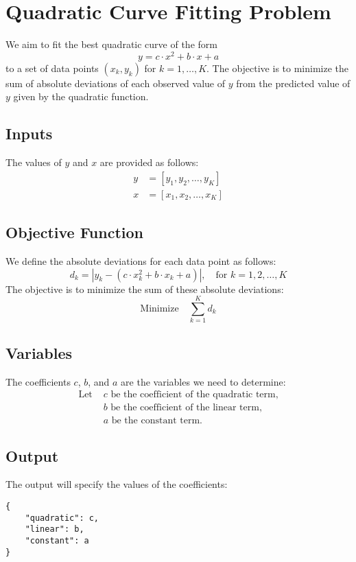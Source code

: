 \documentclass{article}
\begin{document}
\section*{Quadratic Curve Fitting Problem}

We aim to fit the best quadratic curve of the form 
\[
y = c \cdot x^2 + b \cdot x + a
\]
to a set of data points \((x_k, y_k)\) for \(k = 1, \ldots, K\). The objective is to minimize the sum of absolute deviations of each observed value of \(y\) from the predicted value of \(y\) given by the quadratic function.

\subsection*{Inputs}
The values of \(y\) and \(x\) are provided as follows:
\begin{align*}
y & = [y_{1}, y_{2}, \ldots, y_{K}] \\
x & = [x_{1}, x_{2}, \ldots, x_{K}]
\end{align*}

\subsection*{Objective Function}
We define the absolute deviations for each data point as follows:
\[
d_k = |y_k - (c \cdot x_k^2 + b \cdot x_k + a)|, \quad \text{for } k = 1, 2, \ldots, K
\]
The objective is to minimize the sum of these absolute deviations:
\[
\text{Minimize} \quad \sum_{k=1}^{K} d_k
\]

\subsection*{Variables}
The coefficients \(c\), \(b\), and \(a\) are the variables we need to determine:
\begin{align*}
\text{Let } & c \text{ be the coefficient of the quadratic term,} \\
& b \text{ be the coefficient of the linear term,} \\
& a \text{ be the constant term.}
\end{align*}

\subsection*{Output}
The output will specify the values of the coefficients:
\begin{verbatim}
{
    "quadratic": c,
    "linear": b,
    "constant": a
}
\end{verbatim}
\end{document}
